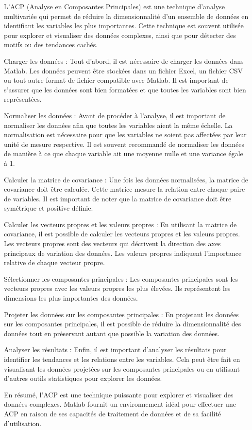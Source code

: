 
\par L'ACP (Analyse en Composantes Principales) est une technique d'analyse multivariée qui permet de réduire la dimensionnalité d'un ensemble de données en identifiant les variables les plus importantes. Cette technique est souvent utilisée pour explorer et visualiser des données complexes, ainsi que pour détecter des motifs ou des tendances cachés.

\begin {enumurated}
\item Charger les données : Tout d'abord, il est nécessaire de charger les données dans Matlab. Les données peuvent être stockées dans un fichier Excel, un fichier CSV ou tout autre format de fichier compatible avec Matlab. Il est important de s'assurer que les données sont bien formatées et que toutes les variables sont bien représentées.


\item Normaliser les données : Avant de procéder à l'analyse, il est important de normaliser les données afin que toutes les variables aient la même échelle. La normalisation est nécessaire pour que les variables ne soient pas affectées par leur unité de mesure respective. Il est souvent recommandé de normaliser les données de manière à ce que chaque variable ait une moyenne nulle et une variance égale à 1.

\item Calculer la matrice de covariance : Une fois les données normalisées, la matrice de covariance doit être calculée. Cette matrice mesure la relation entre chaque paire de variables. Il est important de noter que la matrice de covariance doit être symétrique et positive définie.

\item Calculer les vecteurs propres et les valeurs propres : En utilisant la matrice de covariance, il est possible de calculer les vecteurs propres et les valeurs propres. Les vecteurs propres sont des vecteurs qui décrivent la direction des axes principaux de variation des données. Les valeurs propres indiquent l'importance relative de chaque vecteur propre.

\item Sélectionner les composantes principales : Les composantes principales sont les vecteurs propres avec les valeurs propres les plus élevées. Ils représentent les dimensions les plus importantes des données.

\item Projeter les données sur les composantes principales : En projetant les données sur les composantes principales, il est possible de réduire la dimensionnalité des données tout en préservant autant que possible la variation des données.
\item Analyser les résultats : Enfin, il est important d'analyser les résultats pour identifier les tendances et les relations entre les variables. Cela peut être fait en visualisant les données projetées sur les composantes principales ou en utilisant d'autres outils statistiques pour explorer les données.

\end {enumurated}

\par En résumé, l'ACP est une technique puissante pour explorer et visualiser des données complexes. Matlab fournit un environnement idéal pour effectuer une ACP en raison de ses capacités de traitement de données et de sa facilité d'utilisation.
